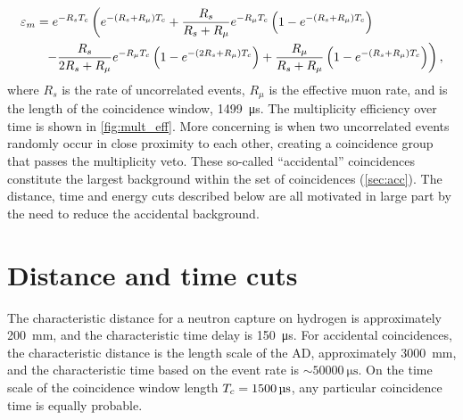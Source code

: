 \begin{align}
    \label{eq:mult_eff}
    \begin{split}
        \varepsilon_m &= e^{-R_s T_c}
        \left(
            e^{-(R_s + R_\mu)T_c} +
            \frac{R_s}{R_s+R_\mu} e^{-R_\mu T_c}
            \left(
                1 - e^{-(R_s + R_\mu)T_c}
            \right)
        \right. \\
              &\ \ \left. - \frac{R_s}{2R_s + R_\mu} e^{-R_\mu T_c}
                  \left(
                      1 - e^{-(2R_s + R_\mu)T_c}
                  \right) +
                  \frac{R_\mu}{R_s + R_\mu}
                  \left(
                      1 - e^{-(R_s + R_\mu)T_c}
                  \right)
              \right),
    \end{split}
\end{align}
where $R_s$ is the rate of uncorrelated events,
$R_\mu$ is the effective muon rate,
and \tc{} is the length of the coincidence window, \SI{1499}{\us}.
The multiplicity efficiency over time is shown in \cref{fig:mult_eff}.
More concerning is when two uncorrelated events
randomly occur in close proximity to each other,
creating a  coincidence group that passes the multiplicity veto.
These so-called ``accidental'' coincidences
constitute the largest background within the set of  coincidences
(\cref{sec:acc}).
The distance, time and energy cuts described below
are all motivated in large part by the need to reduce the accidental background.

\section{Distance and time cuts}
\label{sec:DT_cut}

The characteristic distance for a neutron capture on hydrogen
is approximately \SI{200}{\milli\meter},
and the characteristic time delay is \SI{150}{\us}.
For accidental coincidences, the characteristic distance is
the length scale of the AD, approximately \SI{3000}{\milli\meter},
and the characteristic time based on the  event rate
is $\sim\SI{50000}{\us}$.
On the time scale of the coincidence window length $\tc=\SI{1500}{\us}$,
any particular coincidence time is equally probable.


